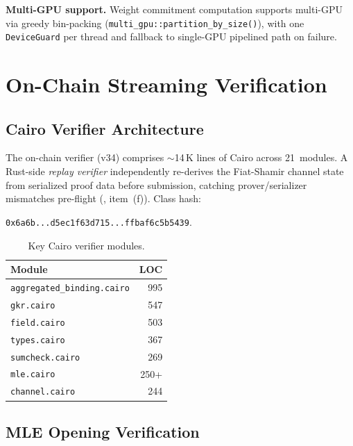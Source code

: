 \documentclass[10pt,twocolumn]{article}
\theoremstyle{definition}
\theoremstyle{remark}
\begin{document}
\textbf{Multi-GPU support.}
Weight commitment computation supports multi-GPU via greedy
bin-packing (\texttt{multi\_gpu::partition\_by\_size()}), with one
\texttt{DeviceGuard} per thread and fallback to single-GPU pipelined
path on failure.


\section{On-Chain Streaming Verification}\label{sec:onchain}

\subsection{Cairo Verifier Architecture}

The on-chain verifier (v34) comprises $\sim$14\,K lines of Cairo across
21~modules.
A Rust-side \emph{replay verifier} independently re-derives the
Fiat-Shamir channel state from serialized proof data before
submission, catching prover/serializer mismatches pre-flight
(, item~(f)).
Class hash:\par
{\small\texttt{0x6a6b...d5ec1f63d715...ffbaf6c5b5439}}.

\begin{table}[t]
  \centering\small
  \caption{Key Cairo verifier modules.}
  \label{tab:cairo}
  \begin{tabular}{@{}lr@{}}
    \toprule
    \textbf{Module} & \textbf{LOC} \\
    \midrule
    \texttt{aggregated\_binding.cairo} & 995 \\
    \texttt{gkr.cairo} & 547 \\
    \texttt{field.cairo} & 503 \\
    \texttt{types.cairo} & 367 \\
    \texttt{sumcheck.cairo} & 269 \\
    \texttt{mle.cairo} & 250+ \\
    \texttt{channel.cairo} & 244 \\
    \bottomrule
  \end{tabular}
\end{table}

\subsection{MLE Opening Verification}
\end{document}
